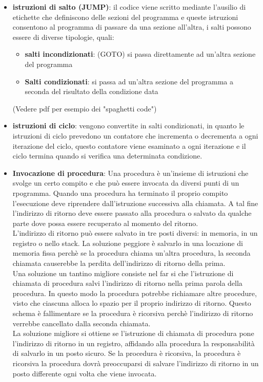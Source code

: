 \documentclass[12pt]{report}
\begin{document}
\begin{itemize}
\begin{itemize}
			\end{itemize}
			\item \textbf{istruzioni di salto (JUMP)}: il codice viene scritto mediante l'ausilio di etichette che definiscono delle sezioni del programma e queste istruzioni consentono al programma di passare da una sezione all'altra, i salti possono essere di diverse tipologie, quali:
			\begin{itemize}
				\item \textbf{salti incondizionati}: (GOTO) si passa direttamente ad un'altra sezione del programma
				\item \textbf{Salti condizionati}: si passa ad un'altra sezione del programma a seconda del risultato della condizione data
			\end{itemize}
			(Vedere pdf per esempio dei "spaghetti code")
			\item \textbf{istruzioni di ciclo}: vengono convertite in salti condizionati, in quanto le istruzioni di ciclo prevedono un contatore che incrementa o decrementa a ogni iterazione del ciclo, questo contatore viene esaminato a ogni iterazione e il ciclo termina quando si verifica una determinata condizione.
			\item \textbf{Invocazione di procedura}: Una procedura è un'insieme di istruzioni che svolge un certo compito e che può essere invocata da diversi punti di un rpogramma. Quando una procedura ha terminato il proprio compito l'esecuzione deve riprendere dall'istruzione successiva alla chiamata. A tal fine l'indirizzo di ritorno deve essere passato alla procedura o salvato da qualche parte dove possa essere recuperato al momento del ritorno. \\
			L'indirizzo di ritorno può essere salvato in tre posti diversi: in memoria, in un registro o nello stack. La soluzione peggiore è salvarlo in una locazione di memoria fissa perchè se la procedura chiama un'altra procedura, la seconda chiamata causerebbe la perdita dell'indirizzo di ritorno della prima. \\
			Una soluzione un tantino migliore consiste nel far si che l'istruzione di chiamata di procedura salvi l'indirizzo di ritorno nella prima parola della procedura. In questo modo la procedura potrebbe richiamare altre procedure, visto che ciascuna alloca lo spazio per il proprio indirizzo di ritorno. Questo schema è fallimentare se la procedura è ricorsiva perchè l'indirizzo di ritorno verrebbe cancellato dalla seconda chiamata. \\
			La soluzione migliore si ottiene se l'istruzione di chiamata di procedura pone l'indirizzo di ritorno in un registro, affidando alla procedura la responsabilità di salvarlo in un posto sicuro. Se la procedura è ricorsiva, la procedura è ricorsiva la procedura dovrà preoccuparsi di salvare l'indirizzo di ritorno in un posto differente ogni volta che viene invocata. \\

\end{itemize}
\end{document}
